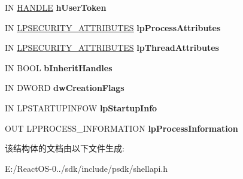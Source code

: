 \begin{DoxyCompactItemize}
IN \hyperlink{interfacevoid}{H\+A\+N\+D\+LE} {\bfseries h\+User\+Token}
\item 
\mbox{\label{struct___s_h_c_r_e_a_t_e_p_r_o_c_e_s_s_i_n_f_o_w_a7eb8305cf12625c84e69038526308b53}} 
IN \hyperlink{struct___s_e_c_u_r_i_t_y___a_t_t_r_i_b_u_t_e_s}{L\+P\+S\+E\+C\+U\+R\+I\+T\+Y\+\_\+\+A\+T\+T\+R\+I\+B\+U\+T\+ES} {\bfseries lp\+Process\+Attributes}
\item 
\mbox{\label{struct___s_h_c_r_e_a_t_e_p_r_o_c_e_s_s_i_n_f_o_w_aeecc910bad6ca7b74a368dfa40484ea9}} 
IN \hyperlink{struct___s_e_c_u_r_i_t_y___a_t_t_r_i_b_u_t_e_s}{L\+P\+S\+E\+C\+U\+R\+I\+T\+Y\+\_\+\+A\+T\+T\+R\+I\+B\+U\+T\+ES} {\bfseries lp\+Thread\+Attributes}
\item 
\mbox{\label{struct___s_h_c_r_e_a_t_e_p_r_o_c_e_s_s_i_n_f_o_w_a85513d50caa64d3affe3d055e257e266}} 
IN B\+O\+OL {\bfseries b\+Inherit\+Handles}
\item 
\mbox{\label{struct___s_h_c_r_e_a_t_e_p_r_o_c_e_s_s_i_n_f_o_w_ae9466e542ac9905d80d81b103cd6749b}} 
IN D\+W\+O\+RD {\bfseries dw\+Creation\+Flags}
\item 
\mbox{\label{struct___s_h_c_r_e_a_t_e_p_r_o_c_e_s_s_i_n_f_o_w_a4f4f75c1f55a467a1b7e62548ef0a647}} 
IN L\+P\+S\+T\+A\+R\+T\+U\+P\+I\+N\+F\+OW {\bfseries lp\+Startup\+Info}
\item 
\mbox{\label{struct___s_h_c_r_e_a_t_e_p_r_o_c_e_s_s_i_n_f_o_w_a7e2d034dd9925a8e16ab41de4b2d7346}} 
O\+UT L\+P\+P\+R\+O\+C\+E\+S\+S\+\_\+\+I\+N\+F\+O\+R\+M\+A\+T\+I\+ON {\bfseries lp\+Process\+Information}
\end{DoxyCompactItemize}


该结构体的文档由以下文件生成\+:\begin{DoxyCompactItemize}
\item 
E\+:/\+React\+O\+S-\/0../sdk/include/psdk/shellapi.\+h\end{DoxyCompactItemize}
